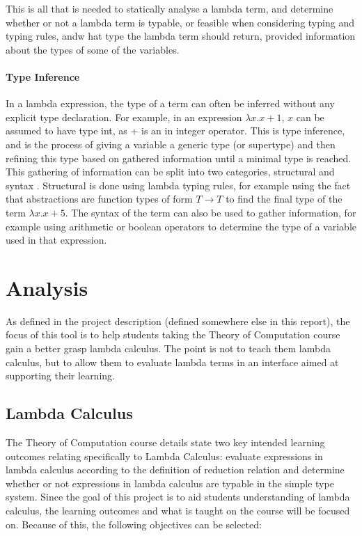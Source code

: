 \documentclass[a4paper,11pt]{report}
\begin{document}
This is all that is needed to statically analyse a lambda term, and determine whether or not a lambda term is typable, or feasible when considering typing and typing rules, andw hat type the lambda term should return, provided information about the types of some of the variables.

\subsubsection{Type Inference}
In a lambda expression, the type of a term can often be inferred without any explicit type declaration. For example, in an expression $\lambda x.x+1$, $x$ can be assumed to have type int, as + is an in integer operator. This is type inference, and is the process of giving a variable a generic type (or supertype) and then refining this type based on gathered information until a minimal type is reached. \cite{Gay2019} \cite{Bezem2008} \cite{Wiesner2011}\\

This gathering of information can be split into two categories, structural and syntax \cite{Bezem2008}. Structural is done using lambda typing rules, for example using the fact that abstractions are function types of form $T \rightarrow T$ to find the final type of the term $\lambda x.x+5$. The syntax of the term can also be used to gather information, for example using arithmetic or boolean operators to determine the type of a variable used in that expression.

\renewcommand{\cleardoublepage}{}
\renewcommand{\clearpage}{}
\chapter{Analysis}
As defined in the project description (defined somewhere else in this report), the focus of this tool is to help students taking the Theory of Computation course gain a better grasp lambda calculus. The point is not to teach them lambda calculus, but to allow them to evaluate lambda terms in an interface aimed at supporting their learning.

\section{Lambda Calculus}
The Theory of Computation course details \cite{CourseSpecification} state two key intended learning outcomes relating specifically to Lambda Calculus: evaluate expressions in lambda calculus according to the definition of reduction relation and determine whether or not expressions in lambda calculus are typable in the simple type system. Since the goal of this project is to aid students understanding of lambda calculus, the learning outcomes and what is taught on the course will be focused on. Because of this, the following objectives can be selected:
\end{document}
